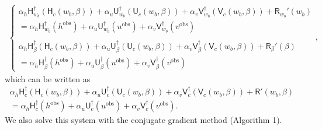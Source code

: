 \documentclass[paper=a4, fontsize=11pt]{article}
\begin{document}
\begin{align}
\begin{cases}
\alpha_h \mathsf{H}_{w_b}^\dagger (\mathsf{H}_c(w_b,\beta))
+\alpha_u \mathsf{U}_{w_b}^\dagger (\mathsf{U}_c(w_b,\beta))
+\alpha_v \mathsf{V}_{w_b}^\dagger (\mathsf{V}_c(w_b,\beta))  + \mathsf{R}_{w_b}'(w_b)   \\
= \alpha_h \mathsf{H}_{w_b}^\dagger (h^{\mathrm{obs}}) + \alpha_u\mathsf{U}_{w_b}^\dagger (u^{\mathrm{obs}})
+\alpha_v\mathsf{V}_{w_b}^\dagger (v^{\mathrm{obs}}) \\ \\
\alpha_h\mathsf{H}_{\beta}^\dagger (\mathsf{H}_c(w_b,\beta))
+\alpha_u\mathsf{U}_{\beta}^\dagger (\mathsf{U}_c(w_b,\beta))
+\alpha_v\mathsf{V}_{\beta}^\dagger (\mathsf{V}_c(w_b,\beta))  + \mathsf{R}_{\beta}'(\beta)   \\
= \alpha_h\mathsf{H}_{\beta}^\dagger (h^{\mathrm{obs}}) +\alpha_u\mathsf{U}_{\beta}^\dagger (u^{\mathrm{obs}})
+\alpha_v\mathsf{V}_{\beta}^\dagger (v^{\mathrm{obs}})
\end{cases},
\end{align}
which can be written as
\begin{align}
\alpha_h \mathsf{H}_c^\dagger(\mathsf{H}_c(w_b,\beta))+\alpha_u\mathsf{U}_c^\dagger(\mathsf{U}_c(w_b,\beta))
+\alpha_v\mathsf{V}_c^\dagger(\mathsf{V}_c(w_b,\beta)) + \mathsf{R}'(w_b,\beta)\nonumber \\ =
\alpha_h\mathsf{H}_{c}^\dagger (h^{\mathrm{obs}}) + \alpha_u\mathsf{U}_{c}^\dagger (u^{\mathrm{obs}})
+\alpha_v\mathsf{V}_{c}^\dagger (v^{\mathrm{obs}}).
\end{align}
We also solve this system with the conjugate gradient method (Algorithm 1).

\newpage
\end{document}
